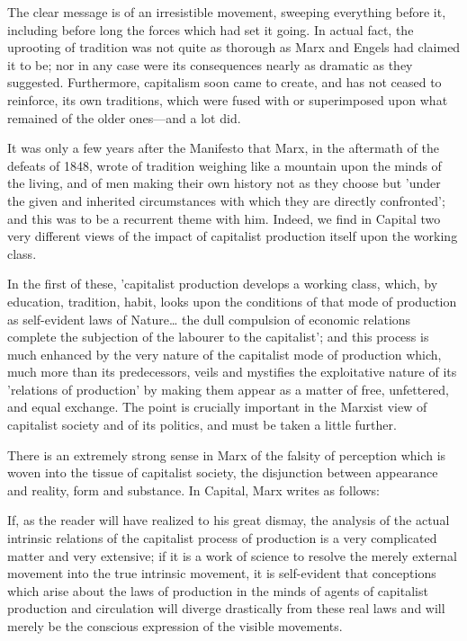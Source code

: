 The clear message is of an irresistible movement, sweeping everything before it, including before long the forces which had set it going. In actual fact, the uprooting of tradition was not quite as thorough as Marx and Engels had claimed it to be; nor in any case were its consequences nearly as dramatic as they suggested. Furthermore, capitalism soon came to create, and has not ceased to reinforce, its own traditions, which were fused with or superimposed upon what remained of the older ones—and a lot did.

It was only a few years after the Manifesto that Marx, in the aftermath of the defeats of 1848, wrote of tradition weighing like a mountain upon the minds of the living, and of men making their own history not as they choose but 'under the given and inherited circumstances with which they are directly confronted'; and this was to be a recurrent theme with him. Indeed, we find in Capital two very different views of the impact of capitalist production itself upon the working class.

In the first of these, 'capitalist production develops a working class, which, by education, tradition, habit, looks upon the conditions of that mode of production as self-evident laws of Nature\dots{} the dull compulsion of economic relations complete the subjection of the labourer to the capitalist'; and this process is much enhanced by the very nature of the capitalist mode of production which, much more than its predecessors, veils and mystifies the exploitative nature of its 'relations of production' by making them appear as a matter of free, unfettered, and equal exchange. The point is crucially important in the Marxist view of capitalist society and of its politics, and must be taken a little further.

There is an extremely strong sense in Marx of the falsity of perception which is woven into the tissue of capitalist society, the disjunction between appearance and reality, form and substance. In Capital, Marx writes as follows:
\begin{displayquote}
    If, as the reader will have realized to his great dismay, the analysis of the actual intrinsic relations of the capitalist process of production is a very complicated matter and very extensive; if it is a work of science to resolve the merely external movement into the true intrinsic movement, it is self-evident that conceptions which arise about the laws of production in the minds of agents of capitalist production and circulation will diverge drastically from these real laws and will merely be the conscious expression of the visible movements.
\end{displayquote}

